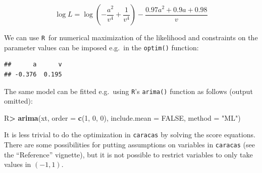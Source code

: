 \documentclass[10pt,]{article}
\newenvironment{Shaded}{\begin{snugshade}}{\end{snugshade}}
\newcommand{\DataTypeTok}[1]{\textcolor[rgb]{0.13,0.29,0.53}{#1}}
\newcommand{\DecValTok}[1]{\textcolor[rgb]{0.00,0.00,0.81}{#1}}
\newcommand{\FloatTok}[1]{\textcolor[rgb]{0.00,0.00,0.81}{#1}}
\newcommand{\KeywordTok}[1]{\textcolor[rgb]{0.13,0.29,0.53}{\textbf{#1}}}
\newcommand{\NormalTok}[1]{#1}
\newcommand{\OperatorTok}[1]{\textcolor[rgb]{0.81,0.36,0.00}{\textbf{#1}}}
\newcommand{\OtherTok}[1]{\textcolor[rgb]{0.56,0.35,0.01}{#1}}
\newcommand{\StringTok}[1]{\textcolor[rgb]{0.31,0.60,0.02}{#1}}
\begin{document}
\[
\log L = \log{\left(- \frac{a^{2}}{v^{4}} + \frac{1}{v^{4}} \right)} - \frac{0.97 a^{2} + 0.9 a + 0.98}{v}
\]

We can use \texttt{R}\ for numerical maximization of the likelihood and
constraints on the parameter values can be imposed e.g.~in the
\texttt{optim()} function:

\begin{Shaded}
\end{Shaded}

\begin{verbatim}
##      a      v 
## -0.376  0.195
\end{verbatim}

The same model can be fitted e.g.~using \texttt{R}'s \texttt{arima()}
function as follows (output omitted):

\begin{Shaded}
\begin{Highlighting}[]
\NormalTok{R}\OperatorTok{>}\StringTok{ }\KeywordTok{arima}\NormalTok{(xt, }\DataTypeTok{order =} \KeywordTok{c}\NormalTok{(}\DecValTok{1}\NormalTok{, }\DecValTok{0}\NormalTok{, }\DecValTok{0}\NormalTok{), }\DataTypeTok{include.mean =} \OtherTok{FALSE}\NormalTok{, }\DataTypeTok{method =} \StringTok{"ML"}\NormalTok{)}
\end{Highlighting}
\end{Shaded}

It is less trivial to do the optimization in \texttt{caracas} by solving
the score equations. There are some possibilities for putting
assumptions on variables in \texttt{caracas} (see the ``Reference''
vignette), but it is not possible to restrict variables to only take
values in \((-1, 1)\).
\end{document}
